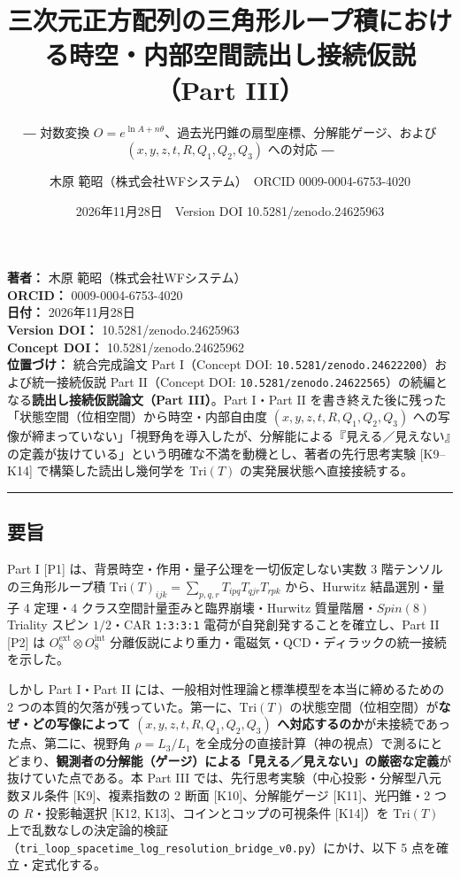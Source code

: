 \documentclass[
  a4paper,
]{ltjsarticle}
\title{三次元正方配列の三角形ループ積における時空・内部空間読出し接続仮説（Part
III）}
\subtitle{― 対数変換
\(O = e^{\ln A + n\theta}\)、過去光円錐の扇型座標、分解能ゲージ、および
\((x, y, z, t, R, Q_1, Q_2, Q_3)\) への対応 ―}
\author{木原 範昭（株式会社WFシステム）　ORCID 0009-0004-6753-4020}
\date{2026年11月28日　Version DOI 10.5281/zenodo.24625963}
\begin{document}
\maketitle

{
\setcounter{tocdepth}{2}
\tableofcontents
}
\textbf{著者：} 木原 範昭（株式会社WFシステム）\\
\textbf{ORCID：} 0009-0004-6753-4020\\
\textbf{日付：} 2026年11月28日\\
\textbf{Version DOI：} 10.5281/zenodo.24625963\\
\textbf{Concept DOI：} 10.5281/zenodo.24625962\\
\textbf{位置づけ：} 統合完成論文 Part I（Concept DOI:
\texttt{10.5281/zenodo.24622200}）および統一接続仮説 Part II（Concept
DOI:
\texttt{10.5281/zenodo.24622565}）の続編となる\textbf{読出し接続仮説論文（Part
III）}。Part I・Part II
を書き終えた後に残った「状態空間（位相空間）から時空・内部自由度
\((x, y, z, t, R, Q_1, Q_2, Q_3)\)
への写像が締まっていない」「視野角を導入したが、分解能による『見える／見えない』の定義が抜けている」という明確な不満を動機とし、著者の先行思考実験
{[}K9--K14{]} で構築した読出し幾何学を \(\mathrm{Tri}(T)\)
の実発展状態へ直接接続する。

\begin{center}\rule{0.5\linewidth}{0.5pt}\end{center}

\subsection{要旨}\label{ux8981ux65e8}

Part I {[}P1{]} は、背景時空・作用・量子公理を一切仮定しない実数 3
階テンソルの三角形ループ積
\(\mathrm{Tri}(T)_{ijk} = \sum_{p,q,r} T_{ipq} T_{qjr} T_{rpk}\)
から、Hurwitz 結晶選別・量子 4 定理・4
クラス空間計量歪みと臨界崩壊・Hurwitz 質量階層・\(Spin(8)\) Triality
スピン \(1/2\)・CAR \texttt{1:3:3:1}
電荷が自発創発することを確立し、Part II {[}P2{]} は
\(O_8^{\mathrm{ext}} \otimes O_8^{\mathrm{int}}\)
分離仮説により重力・電磁気・QCD・ディラックの統一接続を示した。

しかし Part I・Part II
には、一般相対性理論と標準模型を本当に締めるための 2
つの本質的欠落が残っていた。第一に、\(\mathrm{Tri}(T)\)
の状態空間（位相空間）が\textbf{なぜ・どの写像によって
\((x, y, z, t, R, Q_1, Q_2, Q_3)\)
へ対応するのか}が未接続であった点、第二に、視野角 \(\rho = L_3/L_1\)
を全成分の直接計算（神の視点）で測るにとどまり、\textbf{観測者の分解能（ゲージ）による「見える／見えない」の厳密な定義}が抜けていた点である。本
Part III では、先行思考実験（中心投影・分解型八元数ヌル条件
{[}K9{]}、複素指数の 2 断面 {[}K10{]}、分解能ゲージ {[}K11{]}、光円錐・2
つの \(R\)・投影軸選択 {[}K12, K13{]}、コインとコップの可視条件
{[}K14{]}）を \(\mathrm{Tri}(T)\)
上で乱数なしの決定論的検証（\texttt{tri\_loop\_spacetime\_log\_resolution\_bridge\_v0.py}）にかけ、以下
5 点を確立・定式化する。
\end{document}
